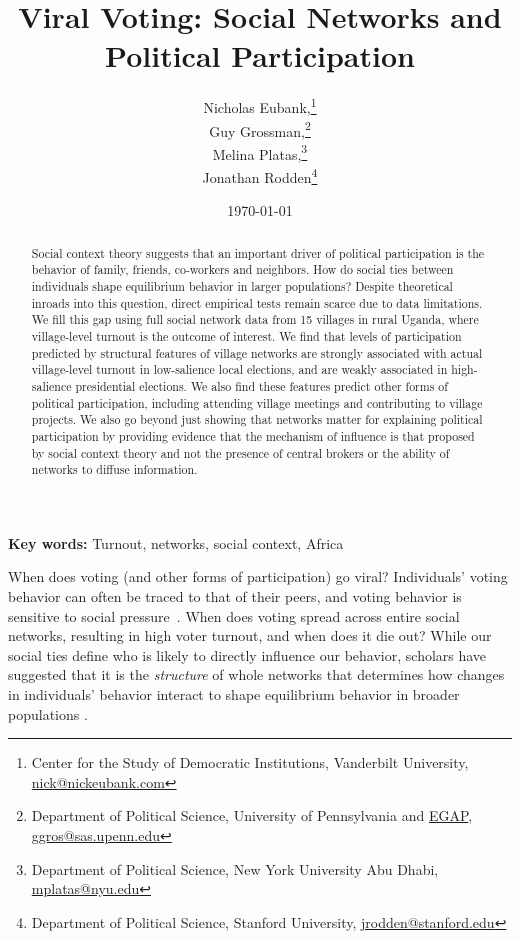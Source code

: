 \documentclass[12pt]{article}
\title{Viral Voting: Social Networks and Political Participation}
\date{\today}
\author{Nicholas Eubank,\footnote{Center for the Study of Democratic Institutions, Vanderbilt University, \href{mailto:nick@nickeubank.com}{nick@nickeubank.com}} \\ Guy Grossman,\footnote{Department of Political Science, University of Pennsylvania and \href{http://egap.org/}{EGAP}, \href{mailto:ggros@sas.upenn.edu}{ggros@sas.upenn.edu}} \\ Melina Platas,\footnote{Department of Political Science, New York University Abu Dhabi, \href{mailto:mplatas@nyu.edu}{mplatas@nyu.edu}} \\ Jonathan Rodden\footnote{Department of Political Science, Stanford University, \href{mailto:jrodden@stanford.edu}{jrodden@stanford.edu}}}
\providecommand{\keywords}[1]{\textbf{Key words:} #1}
\begin{document}
\maketitle

\iffalse
\begin{center}
\textbf{Word Count}\\
Abstract: 146\\
Body: 3,564\\
Bibliography: 435\\
Total: 3,999
\end{center}
\fi


\begin{abstract}
    \noindent Social context theory suggests that an important driver of political participation is the behavior of family, friends, co-workers and neighbors. How do social ties between individuals shape equilibrium behavior in larger populations?  Despite theoretical inroads into this question, direct empirical tests remain scarce due to data limitations. We fill this gap using full social network data from 15 villages in rural Uganda, where village-level turnout is the outcome of interest.  We find that levels of participation predicted by structural features of village networks are strongly associated with actual village-level turnout in low-salience local elections, and are weakly associated in high-salience presidential elections. We also find these features predict other forms of political participation, including  attending village meetings and contributing to village projects. We also go beyond just showing that networks matter for explaining political participation by providing evidence that the mechanism of influence is that proposed by social context theory and not the presence of central brokers or the ability of networks to diffuse information.
\end{abstract}

\keywords{Turnout, networks, social context, Africa}

\pagebreak
\doublespace

When does voting (and other forms of participation) go viral? Individuals' voting behavior can often be traced to that of their peers, and voting behavior is sensitive to social pressure~\citep{ioannides2013neighborhoods,Gerber:2008fs}. When does voting spread across entire social networks, resulting in high voter turnout, and when does it die out? While our social ties define who is likely to directly influence our behavior, scholars have suggested that it is the \emph{structure} of whole networks that determines how changes in individuals' behavior interact to shape equilibrium behavior in broader populations \citep{Siegel:2009vi,Sinclair:2012tq,Rolfe:2012ka,Fowler:2005ts,Larson:2016vk}.
\end{document}
